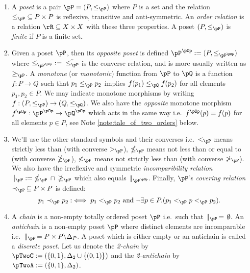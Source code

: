 \documentclass{article}
\begin{document}
\begin{definition}
\label{def:std_order_theory}
\item
\begin{enumerate}
\item
A \emph{poset} is a pair $\pP = (P,\leq_\pP)$ where $P$ is a set and the relation $\leq_\pP \; \subseteq P \times P$ is reflexive, transitive and anti-symmetric. An \emph{order relation} is a relation $\rR \subseteq X \times X$ with these three properties. A poset $(P,\leq_\pP)$ is \emph{finite} if $P$ is a finite set.  

\item
Given a poset $\pP$, then its \emph{opposite poset} is defined $\pP^{\pOp} := (P,\leq_{\pP^{\pOp}})$ where $\leq_{\pP^{\pOp}} \; := \; \breve{\leq_\pP}$ is the converse relation, and is more usually written as $\geq_\pP$. A \emph{monotone} (or \emph{monotonic}) function from $\pP$ to $\pQ$ is a function $f : P \to Q$ such that $p_1 \leq_\pP p_2$ implies $f(p_1) \leq_\pQ f(p_2)$ for all elements $p_1,p_2 \in P$. We may indicate monotone morphisms by writing $f : (P,\leq_\pP) \to (Q,\leq_\pQ)$. We also have the \emph{opposite} monotone morphism $f^{\pOp} : \pP^{\pOp} \to \pQ^{\pOp}$ which acts in the same way i.e.\ $f^{\pOp}(p) = f(p)$ for all elements $p \in P$, see Note \ref{note:tale_of_two_orders} below.


\item
We'll use the other standard symbols and their converses i.e.\ $<_\pP$ means strictly less than (with converse $>_\pP$), $\nleq_\pP$ means not less than or equal to (with converse $\ngeq_\pP$), $\nless_\pP$ means not strictly less than (with converse $\ngtr_\pP$). We also have the irreflexive and symmetric \emph{incomparibility relation} $\parallel_\pP \; := \; \nleq_\pP \, \cap \, \ngeq_\pP$ which also equals $\parallel_{\pP^{\pOp}}$. Finally, $\pP$'s \emph{covering relation} $\prec_\pP \, \subseteq P \times P$ is defined: 
\[
p_1 \prec_\pP p_2
:\iff p_1 <_\pP p_2 \text{ and } \neg\exists p \in P.(p_1 <_\pP p <_\pP p_2).
\]

\item
A \emph{chain} is a non-empty totally ordered poset $\pP$ i.e.\ such that $\parallel_\pP \, = \, \emptyset$. An \emph{antichain} is a non-empty poset $\pP$ where distinct elements are incomparable i.e.\ $\parallel_\pP \, = P \times P \backslash \Delta_P$. A poset which is either empty or an antichain is called a \emph{discrete poset}. Let us denote the \emph{2-chain} by $\pTwoC := (\{0,1\},\Delta_2 \cup \{(0,1)\})$ and the \emph{2-antichain} by $\pTwoA := (\{0,1\},\Delta_2)$.


\end{enumerate}
\end{definition}
\end{document}
